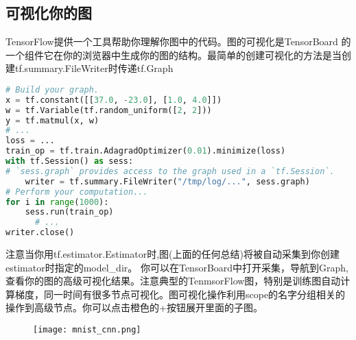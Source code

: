 \subsection{可视化你的图}
TensorFlow提供一个工具帮助你理解你图中的代码。图的可视化是TensorBoard
的一个组件它在你的浏览器中生成你的图的结构。最简单的创建可视化的方法是当创建tf.summary.FileWriter时传递tf.Graph
\begin{lstlisting}[language=Python]
# Build your graph.
x = tf.constant([[37.0, -23.0], [1.0, 4.0]])
w = tf.Variable(tf.random_uniform([2, 2]))
y = tf.matmul(x, w)
# ...
loss = ...
train_op = tf.train.AdagradOptimizer(0.01).minimize(loss)
with tf.Session() as sess:
# `sess.graph` provides access to the graph used in a `tf.Session`.
    writer = tf.summary.FileWriter("/tmp/log/...", sess.graph)
# Perform your computation...
for i in range(1000):
    sess.run(train_op)
      # ...
writer.close()
\end{lstlisting}
注意当你用tf.estimator.Estimator时,图(上面的任何总结)将被自动采集到你创建estimator时指定的model\_dir。
你可以在TensorBoard中打开采集，导航到Graph,查看你的图的高级可视化结果。注意典型的TenmsorFlow图，特别是训练图自动计算梯度，同一时间有很多节点可视化。图可视化操作利用scope的名字分组相关的操作到高级节点。你可以点击橙色的+按钮展开里面的子图。
\begin{figure}[H]
	\texttt{[image: mnist\_cnn.png]}
\end{figure}
